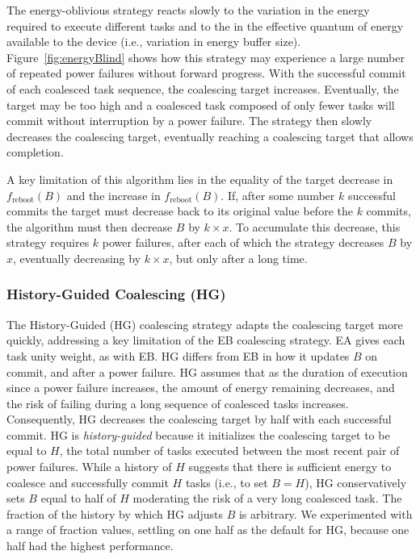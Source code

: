 The energy-oblivious strategy reacts slowly to the variation in the energy
required to execute different tasks and to the in the effective quantum of
energy available to the device (i.e., variation in energy buffer size). 
%
Figure~\ref{fig:energyBlind} shows how this strategy may experience a 
large number of repeated power failures without forward progress.
%
With the successful commit of each coalesced task sequence, the coalescing
target increases.  Eventually, the target may be too high and a coalesced task
composed of only fewer tasks will commit without interruption by a power
failure.
%
The strategy then slowly decreases the coalescing target, eventually reaching a
coalescing target that allows completion.
%

A key limitation of this algorithm lies in the equality of the target decrease
in $f_\text{reboot}(B)$ and the increase in $f_\text{reboot}(B)$.  If, after
some number $k$ successful commits the target must decrease back to its
original value before the $k$ commits, the algorithm must then decrease $B$ by
$k \times x$.  To accumulate this decrease, this strategy requires $k$ power
failures, after each of which the strategy decreases $B$ by $x$, eventually
decreasing by $k \times x$, but only after a long time. 

\subsubsection{History-Guided Coalescing (HG)}
\label{subsec:energyAware}
The History-Guided (HG) coalescing strategy adapts the coalescing target more
quickly, addressing a key limitation of the EB coalescing strategy.  
%
EA gives each task unity weight, as with EB.  
%
HG differs from EB in how it updates $B$ on commit, and after a power failure.
%
HG assumes that as the duration of execution since a power failure increases,
the amount of energy remaining decreases, and the risk of failing during a long
sequence of coalesced tasks increases.  
%
Consequently, HG decreases the coalescing target by half with each successful commit.
%
HG is {\em history-guided} because it initializes the coalescing target to be
equal to $H$, the total number of tasks executed between the most recent pair
of power failures.
%
While a history of $H$ suggests that there is sufficient energy to coalesce and
successfully commit $H$ tasks (i.e., to set $B = H$), HG conservatively sets $B$ equal to half
of $H$ moderating the risk of a very long coalesced task. 
%
The fraction of the history by which HG adjusts $B$ is arbitrary.
We experimented with a range of fraction values, settling on one half as the
default for HG, because one half had the highest performance. 

